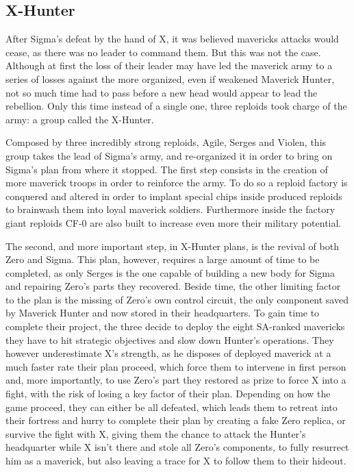 \subsection{X-Hunter}
After Sigma's defeat by the hand of X, it was believed mavericks attacks would cease, as there was no leader to command them. But this was not the case. Although at first the loss of their leader may have led the maverick army to a series of losses against the more organized, even if weakened Maverick Hunter, not so much time had to pass before a new head would appear to lead the rebellion. Only this time instead of a single one, three reploids took charge of the army: a group called the X-Hunter.

Composed by three incredibly strong reploids, Agile, Serges and Violen, this group takes the lead of Sigma's army, and re-organized it in order to bring on Sigma's plan from where it stopped. The first step consists in the creation of more maverick troops in order to reinforce the army. To do so a reploid factory is conquered and altered in order to implant special chips inside produced reploids to brainwash them into loyal maverick soldiers. Furthermore inside the factory giant reploids CF-0 are also built to increase even more their military potential.

The second, and more important step, in X-Hunter plans, is the revival of both Zero and Sigma. This plan, however, requires a large amount of time to be completed, as only Serges is the one capable of building a new body for Sigma and repairing Zero's parts they recovered. Beside time, the other limiting factor to the plan is the missing of Zero's own control circuit, the only component saved by Maverick Hunter and now stored in their headquarters. To gain time to complete their project, the three decide to deploy the eight SA-ranked mavericks they have to hit strategic objectives and slow down Hunter's operations. They however underestimate X's strength, as he disposes of deployed maverick at a much faster rate their plan proceed, which force them to intervene in first person and, more importantly, to use Zero's part they restored  as prize to force X into a fight, with the risk of losing a key factor of their plan. Depending on how the game proceed, they can either be all defeated, which leads them to retreat into their fortress and hurry to complete their plan by creating a fake Zero replica, or survive the fight with X, giving them the chance to attack the Hunter's headquarter while X isn't there and stole all Zero's components, to fully resurrect him as a maverick, but also leaving a trace for X to follow them to their hideout.

